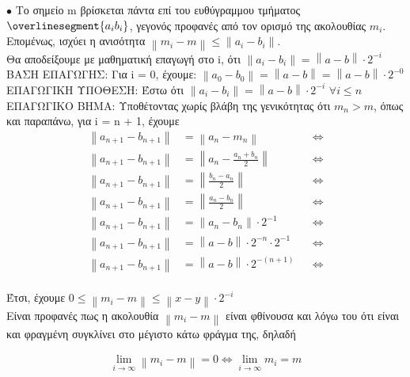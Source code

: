 \documentclass[12pt]{article}
\newcommand{\norm}[1]{\left\lVert#1\right\rVert}
\newcommand{\margin}{\hspace{4pt}}
\begin{document}
$\bullet$ Το σημείο m βρίσκεται πάντα επί του ευθύγραμμου τμήματος $\overlinesegment{a_{i}b_{i}}$,
γεγονός προφανές από τον ορισμό της ακολουθίας $m_i$.
Επομένως, ισχύει η ανισότητα $\norm{m_i - m} \leq \norm{a_i - b_i}$. \\

Θα αποδείξουμε με μαθηματική επαγωγή στο i, ότι $\norm{a_i - b_i} = \norm{a - b} \cdot 2^{-i}$\\

ΒΑΣΗ ΕΠΑΓΩΓΗΣ: Για i = 0, έχουμε: $\norm{a_0 - b_0} = \norm{a - b} = \norm{a - b} \cdot 2^{-0}$\\

ΕΠΑΓΩΓΙΚΗ ΥΠΟΘΕΣΗ: Έστω ότι $\norm{a_i - b_i} = \norm{a - b} \cdot 2^{-i} \margin \forall i \leq n$\\

ΕΠΑΓΩΓΙΚΟ ΒΗΜΑ: Υποθέτοντας χωρίς βλάβη της γενικότητας ότι $m_n > m$,
όπως και παραπάνω, για i = n + 1, έχουμε\\

\begin{align*}
    \norm{a_{n + 1} - b_{n + 1}} & = \norm{a_n - m_n} && \Leftrightarrow \\
    \norm{a_{n + 1} - b_{n + 1}} & = \norm{a_n - \frac{a_n + b_n}{2}} && \Leftrightarrow \\
    \norm{a_{n + 1} - b_{n + 1}} & = \norm{\frac{b_n - a_n}{2}} && \Leftrightarrow \\
    \norm{a_{n + 1} - b_{n + 1}} & = \norm{\frac{a_n - b_n}{2}} && \Leftrightarrow \\
    \norm{a_{n + 1} - b_{n + 1}} & = \norm{a_n - b_n} \cdot {2^{-1}} && \Leftrightarrow \\
    \norm{a_{n + 1} - b_{n + 1}} & = \norm{a - b} \cdot 2^{-n} \cdot {2^{-1}} && \Leftrightarrow \\
    \norm{a_{n + 1} - b_{n + 1}} & = \norm{a - b} \cdot 2^{-(n + 1)} && \Leftrightarrow
\end{align*}\\

Έτσι, έχουμε $0 \leq \norm{m_i - m} \leq \norm{x - y} \cdot 2^{-i}$\\

Είναι προφανές πως η ακολουθία $\norm{m_i - m}$ είναι φθίνουσα και λόγω του ότι είναι
και φραγμένη συγκλίνει στο μέγιστο κάτω φράγμα της, δηλαδή

\begin{align*}
    \lim_{i \to \infty} \norm{m_i - m} = 0 \Leftrightarrow \lim_{i \to \infty} m_i = m
\end{align*}
\end{document}
